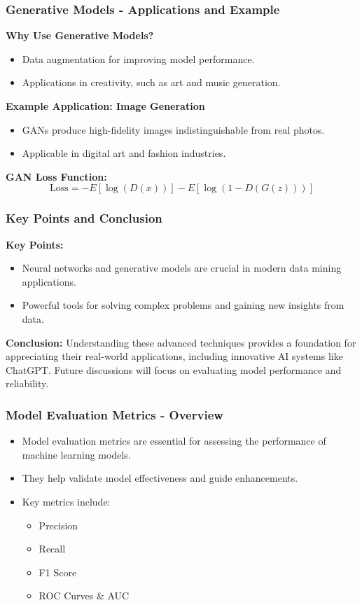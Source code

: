 \documentclass[aspectratio=169]{beamer}
\begin{document}
\begin{frame}[fragile]
    \frametitle{Generative Models - Applications and Example}
    \textbf{Why Use Generative Models?}
    \begin{itemize}
        \item Data augmentation for improving model performance.
        \item Applications in creativity, such as art and music generation.
    \end{itemize}

    \textbf{Example Application: Image Generation}
    \begin{itemize}
        \item GANs produce high-fidelity images indistinguishable from real photos.
        \item Applicable in digital art and fashion industries.
    \end{itemize}

    \textbf{GAN Loss Function:}
    \begin{equation}
        \text{Loss} = -E[\log(D(x))] - E[\log(1-D(G(z)))]
    \end{equation}
\end{frame}

\begin{frame}[fragile]
    \frametitle{Key Points and Conclusion}
    \textbf{Key Points:}
    \begin{itemize}
        \item Neural networks and generative models are crucial in modern data mining applications.
        \item Powerful tools for solving complex problems and gaining new insights from data.
    \end{itemize}

    \textbf{Conclusion:}
    Understanding these advanced techniques provides a foundation for appreciating their real-world applications, including innovative AI systems like ChatGPT. Future discussions will focus on evaluating model performance and reliability.
\end{frame}

\begin{frame}[fragile]
    \frametitle{Model Evaluation Metrics - Overview}
    \begin{itemize}
        \item Model evaluation metrics are essential for assessing the performance of machine learning models.
        \item They help validate model effectiveness and guide enhancements.
        \item Key metrics include:
        \begin{itemize}
            \item Precision
            \item Recall
            \item F1 Score
            \item ROC Curves & AUC
        \end{itemize}
    \end{itemize}
\end{frame}
\end{document}
